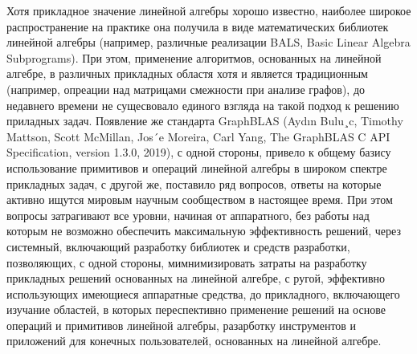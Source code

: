 \documentclass[12pt]{article}  %
\theoremstyle{remark}
\begin{document}
Хотя прикладное значение линейной алгебры хорошо известно, наиболее широкое распространение на практике она получила в виде математических библиотек линейной алгебры (например, различные реализации BALS, Basic Linear Algebra Subprograms). При этом, применение алгоритмов, основанных на линейной алгебре, в различных прикладных областя хотя и является традиционным (например, опреации над матрицами смежности при анализе графов), до недавнего времени не сущесвовало единого взгляда на такой подход к решению приладных задач. Появление же стандарта GraphBLAS (Aydın Bulu¸c, Timothy Mattson, Scott McMillan, Jos´e Moreira, Carl Yang, The GraphBLAS C API Specification, version 1.3.0, 2019), с одной стороны, привело к общему базису использование примитивов и операций линейной алгебры в широком спектре прикладных задач, с другой же, поставило ряд вопросов, ответы на которые активно ищутся мировым научным сообществом в настоящее время. При этом вопросы затрагивают все уровни, начиная от аппаратного, без работы над которым не возможно обеспечить максимальную эффективность решений, через системный, включающий разработку библиотек и средств разработки, позволяющих, с одной стороны, мимнимизировать затраты на разработку прикладных решений основанных на линейной алгебре, с ругой, эффективно использующих имеющиеся аппаратные средства, до прикладного, включающего изучание областей, в которых переспективно применение решений на основе операций и примитивов линейной алгебры, разарботку инструментов и приложений для конечных пользователей, основанных на линейной алгебре.
\end{document}
